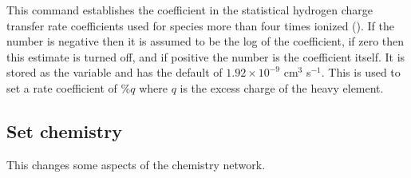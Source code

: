 This command establishes the coefficient in the statistical hydrogen
charge transfer rate coefficients used for species more than four times
ionized (\citealp{Ferland1997}).
If the number is negative then it is assumed
to be the log of the coefficient,
if zero then this estimate is turned off,
and if positive the number is the coefficient itself.
It is stored as the
variable  and has the default of
$1.92\times 10^{-9}$ cm$^3$ s$^{-1}$.
This is used to
set a rate coefficient of  \%$q$
where $q$ is the excess charge of the heavy element.

\subsection{Set chemistry}

This changes some aspects of the chemistry network.
